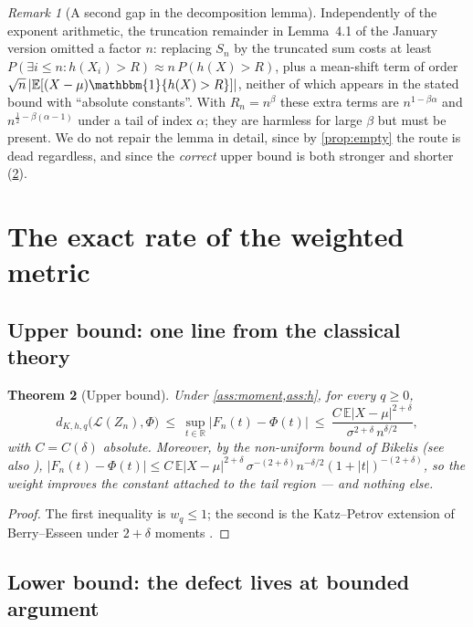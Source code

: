 \documentclass[11pt,a4paper]{article}
\theoremstyle{plain}
\newtheorem{theorem}{Theorem}[section]
\theoremstyle{definition}
\theoremstyle{remark}
\newtheorem{remark}[theorem]{Remark}
\numberwithin{equation}{section}
\newcommand{\R}{\mathbb{R}}
\newcommand{\E}{\mathbb{E}}
\newcommand{\1}{\mathbbm{1}}
\newcommand{\h}{h}
\begin{document}
\begin{remark}[A second gap in the decomposition lemma]\label{rem:missing-n}
Independently of the exponent arithmetic, the truncation remainder in Lemma~4.1 of the
January version omitted a factor $n$: replacing $S_n$ by the truncated sum costs at
least $P(\exists i\le n:\h(X_i)>R)\approx n\,P(\h(X)>R)$, plus a mean-shift term of
order $\sqrt n\,|\E[(X-\mu)\1\{\h(X)>R\}]|$, neither of which appears in the stated
bound with ``absolute constants''. With $R_n=n^\beta$ these extra terms are
$n^{1-\beta\alpha}$ and $n^{\frac12-\beta(\alpha-1)}$ under a tail of index $\alpha$;
they are harmless for large $\beta$ but must be present. We do not repair the lemma in
detail, since by \cref{prop:empty} the route is dead regardless, and since the
\emph{correct} upper bound is both stronger and shorter (\cref{thm:upper}).
\end{remark}

\section{The exact rate of the weighted metric}\label{sec:lower}

\subsection{Upper bound: one line from the classical theory}

\begin{theorem}[Upper bound]\label{thm:upper}
Under \cref{ass:moment,ass:h}, for every $q\ge0$,
\[
d_{K,\h,q}\big(\mathcal L(Z_n),\Phi\big)\ \le\ \sup_{t\in\R}|F_n(t)-\Phi(t)|
\ \le\ \frac{C\,\E|X-\mu|^{2+\delta}}{\sigma^{2+\delta}\,n^{\delta/2}} ,
\]
with $C=C(\delta)$ absolute. Moreover, by the non-uniform bound of Bikelis
\cite{Bikelis1966} (see also \cite[Ch.~V]{Petrov1995}),
$|F_n(t)-\Phi(t)|\le C\,\E|X-\mu|^{2+\delta}\,\sigma^{-(2+\delta)}
n^{-\delta/2}(1+|t|)^{-(2+\delta)}$, so the weight improves the \emph{constant}
attached to the tail region --- and nothing else.
\end{theorem}

\begin{proof}
The first inequality is $w_q\le1$; the second is the Katz--Petrov extension of
Berry--Esseen under $2+\delta$ moments \cite{Bikelis1966,Petrov1995}.
\end{proof}

\subsection{Lower bound: the defect lives at bounded argument}
\end{document}
